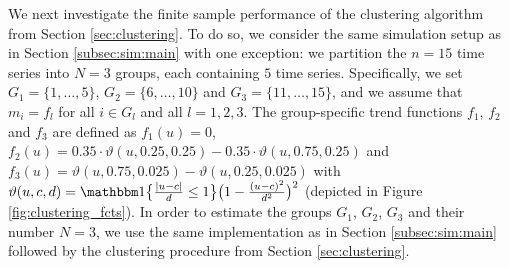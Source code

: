 \documentclass[12pt]{article}
\begin{document}
We next investigate the finite sample performance of the clustering algorithm from Section \ref{sec:clustering}. To do so, we consider the same simulation setup as in Section \ref{subsec:sim:main} with one exception: we partition the $n = 15$ time series into $N=3$ groups, each containing $5$ time series. Specifically, we set $G_1 = \{1,\ldots, 5\}$, $G_2 = \{6,\ldots, 10\}$ and $G_3 =  \{11,\ldots, 15\}$, and we assume that $m_i = f_l$ for all $i \in G_l$ and all $l = 1, 2, 3$. The group-specific trend functions $f_1$, $f_2$ and $f_3$ are defined as $f_1(u) = 0$, $f_2(u) = 0.35 \cdot \vartheta(u,0.25,0.25) - 0.35 \cdot \vartheta(u,0.75,0.25)$ and $f_3(u) = \vartheta(u,0.75,0.025) - \vartheta(u,0.25,0.025)$ with $\vartheta(u,c,d) =  \ind\big\{\frac{|u - c|}{d}\leq 1\big\} \big(1 - \frac{(u - c)^2}{d^2}\big)^2$ (depicted in Figure \ref{fig:clustering_fcts}). In order to estimate the groups $G_1$, $G_2$, $G_3$ and their number $N = 3$, we use the same implementation as in Section \ref{subsec:sim:main} followed by the clustering procedure from Section \ref{sec:clustering}. 
\end{document}
